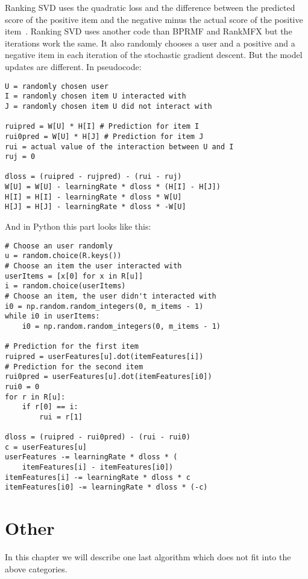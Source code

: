 Ranking SVD uses the quadratic loss and the difference between the
predicted score of the positive item and the negative minus the actual
score of the positive item~\cite{jahrer2011collaborative}.
Ranking SVD uses another code than BPRMF and RankMFX but the iterations
work the same. It also randomly chooses a user and a positive and a
negative item in each iteration of the stochastic gradient descent. 
But the model updates are different. In pseudocode:
\begin{lstlisting}
U = randomly chosen user
I = randomly chosen item U interacted with
J = randomly chosen item U did not interact with

ruipred = W[U] * H[I] # Prediction for item I
rui0pred = W[U] * H[J] # Prediction for item J
rui = actual value of the interaction between U and I 
ruj = 0

dloss = (ruipred - rujpred) - (rui - ruj)
W[U] = W[U] - learningRate * dloss * (H[I] - H[J])
H[I] = H[I] - learningRate * dloss * W[U]
H[J] = H[J] - learningRate * dloss * -W[U]
\end{lstlisting}
And in Python this part looks like this:
\begin{lstlisting}
# Choose an user randomly
u = random.choice(R.keys())
# Choose an item the user interacted with
userItems = [x[0] for x in R[u]]
i = random.choice(userItems)
# Choose an item, the user didn't interacted with
i0 = np.random.random_integers(0, m_items - 1)
while i0 in userItems:
    i0 = np.random.random_integers(0, m_items - 1)

# Prediction for the first item
ruipred = userFeatures[u].dot(itemFeatures[i])
# Prediction for the second item
rui0pred = userFeatures[u].dot(itemFeatures[i0])
rui0 = 0
for r in R[u]:
    if r[0] == i:
        rui = r[1]

dloss = (ruipred - rui0pred) - (rui - rui0)
c = userFeatures[u]
userFeatures -= learningRate * dloss * (
    itemFeatures[i] - itemFeatures[i0])
itemFeatures[i] -= learningRate * dloss * c
itemFeatures[i0] -= learningRate * dloss * (-c)
\end{lstlisting}


\section{Other}
In this chapter we will describe one last algorithm 
which does not fit into the above categories.
